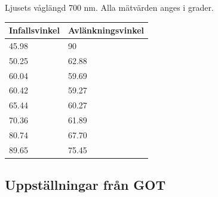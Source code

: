 \documentclass[a4paper]{article}
\begin{document}
Ljusets våglängd 700 nm. Alla mätvärden anges i grader.
\begin{table}[h]
    \begin{tabular}{|l|l|}
    \hline
    Infallsvinkel & Avlänkningsvinkel \\ \hline
    45.98         & 90                \\ \hline
    50.25         & 62.88             \\ \hline
    60.04         & 59.69             \\ \hline
    60.42         & 59.27             \\ \hline
    65.44         & 60.27             \\ \hline
    70.36         & 61.89             \\ \hline
    80.74         & 67.70             \\ \hline
    89.65         & 75.45             \\ \hline
    \end{tabular}
    
\end{table}
\pagebreak
\subsection{Uppställningar från GOT}
\end{document}
